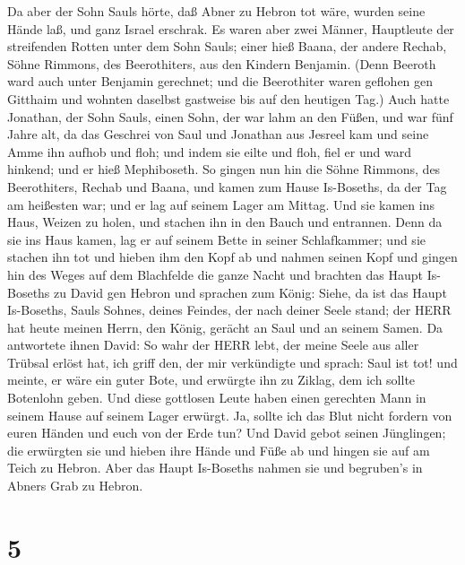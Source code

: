  Da aber der Sohn Sauls hörte, daß Abner zu Hebron tot wäre,
wurden seine Hände laß, und ganz Israel erschrak.  Es waren
aber zwei Männer, Hauptleute der streifenden Rotten unter dem Sohn
Sauls; einer hieß Baana, der andere Rechab, Söhne Rimmons, des
Beerothiters, aus den Kindern Benjamin. (Denn Beeroth ward auch unter
Benjamin gerechnet;  und die Beerothiter waren geflohen gen
Gitthaim und wohnten daselbst gastweise bis auf den heutigen Tag.)
 Auch hatte Jonathan, der Sohn Sauls, einen Sohn, der war
lahm an den Füßen, und war fünf Jahre alt, da das Geschrei von Saul und
Jonathan aus Jesreel kam und seine Amme ihn aufhob und floh; und indem
sie eilte und floh, fiel er und ward hinkend; und er hieß Mephiboseth.
 So gingen nun hin die Söhne Rimmons, des Beerothiters,
Rechab und Baana, und kamen zum Hause Is-Boseths, da der Tag am
heißesten war; und er lag auf seinem Lager am Mittag.  Und
sie kamen ins Haus, Weizen zu holen, und stachen ihn in den Bauch und
entrannen.  Denn da sie ins Haus kamen, lag er auf seinem
Bette in seiner Schlafkammer; und sie stachen ihn tot und hieben ihm den
Kopf ab und nahmen seinen Kopf und gingen hin des Weges auf dem
Blachfelde die ganze Nacht  und brachten das Haupt
Is-Boseths zu David gen Hebron und sprachen zum König: Siehe, da ist das
Haupt Is-Boseths, Sauls Sohnes, deines Feindes, der nach deiner Seele
stand; der HERR hat heute meinen Herrn, den König, gerächt an Saul und
an seinem Samen.  Da antwortete ihnen David: So wahr der
HERR lebt, der meine Seele aus aller Trübsal erlöst hat, 
ich griff den, der mir verkündigte und sprach: Saul ist tot! und meinte,
er wäre ein guter Bote, und erwürgte ihn zu Ziklag, dem ich sollte
Botenlohn geben.  Und diese gottlosen Leute haben einen
gerechten Mann in seinem Hause auf seinem Lager erwürgt. Ja, sollte ich
das Blut nicht fordern von euren Händen und euch von der Erde tun?
 Und David gebot seinen Jünglingen; die erwürgten sie und
hieben ihre Hände und Füße ab und hingen sie auf am Teich zu Hebron.
Aber das Haupt Is-Boseths nahmen sie und begruben's in Abners Grab zu
Hebron.

\hypertarget{section-4}{%
\section{5}\label{section-4}}

